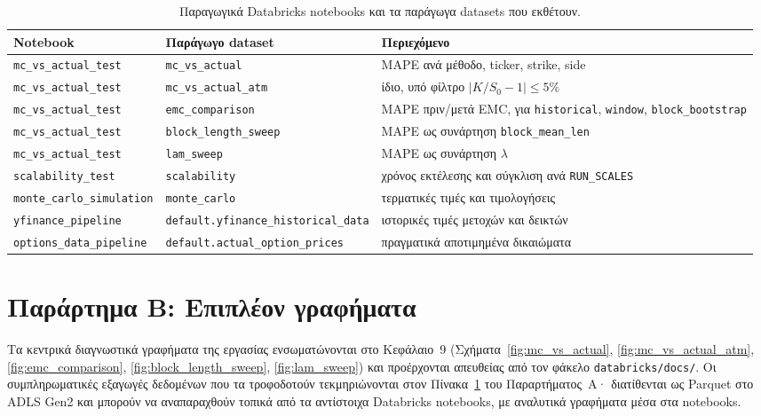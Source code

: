 \documentclass[12pt]{article}
\begin{document}
\begin{table}[H]
\centering
\small
\caption{Παραγωγικά Databricks notebooks και τα παράγωγα datasets που εκθέτουν.}
\label{tab:appA_artifacts}
\begin{tabular}{p{3.8cm} p{4.2cm} p{5.0cm}}
\hline
Notebook & Παράγωγο dataset & Περιεχόμενο \\ \hline
\texttt{mc\_vs\_\allowbreak actual\_test} & \texttt{mc\_vs\_actual} & MAPE ανά μέθοδο, ticker, strike, side \\
\texttt{mc\_vs\_\allowbreak actual\_test} & \texttt{mc\_vs\_\allowbreak actual\_atm} & ίδιο, υπό φίλτρο $|K/S_{0}-1| \leq 5\%$ \\
\texttt{mc\_vs\_\allowbreak actual\_test} & \texttt{emc\_\allowbreak comparison} & MAPE πριν/μετά EMC, για \texttt{historical}, \texttt{window}, \texttt{block\_\allowbreak bootstrap} \\
\texttt{mc\_vs\_\allowbreak actual\_test} & \texttt{block\_\allowbreak length\_sweep} & MAPE ως συνάρτηση \texttt{block\_\allowbreak mean\_len} \\
\texttt{mc\_vs\_\allowbreak actual\_test} & \texttt{lam\_sweep} & MAPE ως συνάρτηση $\lambda$ \\
\texttt{scalability\_test} & \texttt{scalability} & χρόνος εκτέλεσης και σύγκλιση ανά \texttt{RUN\_\allowbreak SCALES} \\
\texttt{monte\_carlo\_\allowbreak simulation} & \texttt{monte\_carlo} & τερματικές τιμές και τιμολογήσεις \\
\texttt{yfinance\_\allowbreak pipeline} & \texttt{default.\allowbreak yfinance\_\allowbreak historical\_\allowbreak data} & ιστορικές τιμές μετοχών και δεικτών \\
\texttt{options\_\allowbreak data\_pipeline} & \texttt{default.\allowbreak actual\_\allowbreak option\_prices} & πραγματικά αποτιμημένα δικαιώματα \\ \hline
\end{tabular}
\end{table}

\section{Παράρτημα Β: Επιπλέον γραφήματα}

Τα κεντρικά διαγνωστικά γραφήματα της εργασίας ενσωματώνονται στο Κεφάλαιο~9 (Σχήματα~\ref{fig:mc_vs_actual}, \ref{fig:mc_vs_actual_atm}, \ref{fig:emc_comparison}, \ref{fig:block_length_sweep}, \ref{fig:lam_sweep}) και προέρχονται απευθείας από τον φάκελο \texttt{databricks/docs/}. Οι συμπληρωματικές εξαγωγές δεδομένων που τα τροφοδοτούν τεκμηριώνονται στον Πίνακα~\ref{tab:appA_artifacts} του Παραρτήματος~Α· διατίθενται ως Parquet στο ADLS Gen2 και μπορούν να αναπαραχθούν τοπικά από τα αντίστοιχα Databricks notebooks, με αναλυτικά γραφήματα μέσα στα notebooks.
\end{document}
